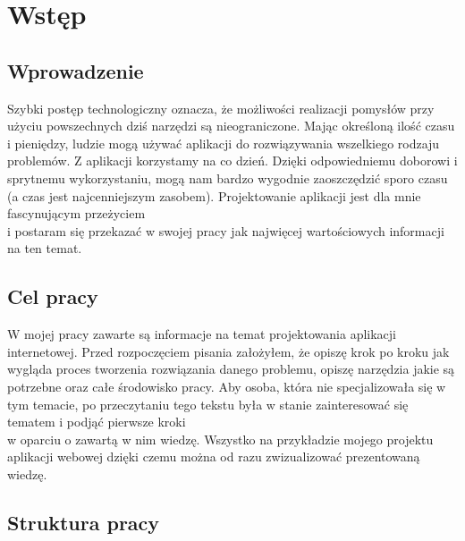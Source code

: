 \chapter{Wstęp}

\section{Wprowadzenie}
Szybki postęp technologiczny oznacza, że możliwości realizacji pomysłów przy użyciu powszechnych dziś narzędzi są nieograniczone. Mając określoną ilość czasu i pieniędzy, ludzie mogą używać aplikacji do rozwiązywania wszelkiego rodzaju problemów. Z aplikacji korzystamy na co dzień. Dzięki odpowiedniemu doborowi i sprytnemu wykorzystaniu, mogą nam bardzo wygodnie zaoszczędzić sporo czasu (a czas jest najcenniejszym zasobem). Projektowanie aplikacji jest dla mnie fascynującym przeżyciem \\i postaram się przekazać w swojej pracy jak najwięcej wartościowych informacji na ten temat.

\section{Cel pracy}
W mojej pracy zawarte są informacje na temat projektowania aplikacji internetowej. Przed rozpoczęciem pisania założyłem, że opiszę krok po kroku jak wygląda proces tworzenia rozwiązania danego problemu, opiszę narzędzia jakie są potrzebne oraz całe środowisko pracy. Aby osoba, która nie specjalizowała się w tym temacie, po przeczytaniu tego tekstu była w stanie zainteresować się tematem i podjąć pierwsze kroki \\w oparciu o zawartą w nim wiedzę. Wszystko na przykładzie mojego projektu aplikacji webowej dzięki czemu można od razu zwizualizować prezentowaną wiedzę.

\section{Struktura pracy}